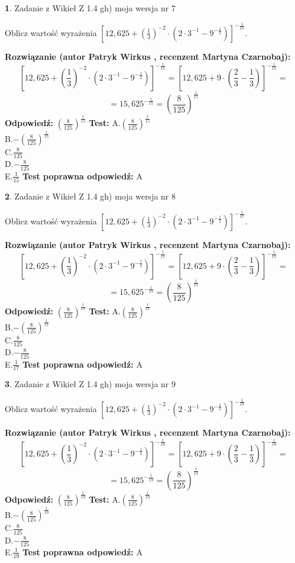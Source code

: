 \documentclass[12pt, a4paper]{article}
\theoremstyle{definition} %
\newtheorem{zad}{}
\newcommand{\zadStart}[1]{\begin{zad}#1\newline}
\newcommand{\zadStop}{\end{zad}}
\newcommand{\rozwStart}[2]{\noindent \textbf{Rozwiązanie (autor #1 , recenzent #2): }\newline}
\newcommand{\rozwStop}{\newline}
\newcommand{\odpStart}{\noindent \textbf{Odpowiedź:}\newline}
\newcommand{\odpStop}{\newline}
\newcommand{\testStart}{\noindent \textbf{Test:}\newline}
\newcommand{\testStop}{\newline}
\newcommand{\kluczStart}{\noindent \textbf{Test poprawna odpowiedź:}\newline}
\newcommand{\kluczStop}{\newline}
\begin{document}
\zadStart{Zadanie z Wikieł Z 1.4 gh) moja wersja nr 7}

Oblicz wartość wyrażenia $[12,625+(\frac{1}{3})^{-2}\cdot(2\cdot 3^{-1} - 9^{-\frac{1}{2}})]^{-\frac{1}{15}}$.
\zadStop
\rozwStart{Patryk Wirkus}{Martyna Czarnobaj}
$$[12,625+(\frac{1}{3})^{-2}\cdot(2\cdot 3^{-1} - 9^{-\frac{1}{2}})]^{-\frac{1}{15}} = [12,625+9\cdot (\frac{2}{3}-\frac{1}{3})]^{-\frac{1}{15}} =$$
$$=15,625^{-\frac{1}{15}} = (\frac{8}{125})^\frac{1}{15}$$
\rozwStop
\odpStart
$(\frac{8}{125})^\frac{1}{15}$
\odpStop
\testStart
A.$(\frac{8}{125})^\frac{1}{15}$\\ B.$-(\frac{8}{125})^\frac{1}{15}$\\ C.$\frac{8}{125}$\\ D.$-\frac{8}{125}$\\ E.$\frac{1}{15}$
\testStop
\kluczStart
A
\kluczStop



\zadStart{Zadanie z Wikieł Z 1.4 gh) moja wersja nr 8}

Oblicz wartość wyrażenia $[12,625+(\frac{1}{3})^{-2}\cdot(2\cdot 3^{-1} - 9^{-\frac{1}{2}})]^{-\frac{1}{17}}$.
\zadStop
\rozwStart{Patryk Wirkus}{Martyna Czarnobaj}
$$[12,625+(\frac{1}{3})^{-2}\cdot(2\cdot 3^{-1} - 9^{-\frac{1}{2}})]^{-\frac{1}{17}} = [12,625+9\cdot (\frac{2}{3}-\frac{1}{3})]^{-\frac{1}{17}} =$$
$$=15,625^{-\frac{1}{17}} = (\frac{8}{125})^\frac{1}{17}$$
\rozwStop
\odpStart
$(\frac{8}{125})^\frac{1}{17}$
\odpStop
\testStart
A.$(\frac{8}{125})^\frac{1}{17}$\\ B.$-(\frac{8}{125})^\frac{1}{17}$\\ C.$\frac{8}{125}$\\ D.$-\frac{8}{125}$\\ E.$\frac{1}{17}$
\testStop
\kluczStart
A
\kluczStop



\zadStart{Zadanie z Wikieł Z 1.4 gh) moja wersja nr 9}

Oblicz wartość wyrażenia $[12,625+(\frac{1}{3})^{-2}\cdot(2\cdot 3^{-1} - 9^{-\frac{1}{2}})]^{-\frac{1}{19}}$.
\zadStop
\rozwStart{Patryk Wirkus}{Martyna Czarnobaj}
$$[12,625+(\frac{1}{3})^{-2}\cdot(2\cdot 3^{-1} - 9^{-\frac{1}{2}})]^{-\frac{1}{19}} = [12,625+9\cdot (\frac{2}{3}-\frac{1}{3})]^{-\frac{1}{19}} =$$
$$=15,625^{-\frac{1}{19}} = (\frac{8}{125})^\frac{1}{19}$$
\rozwStop
\odpStart
$(\frac{8}{125})^\frac{1}{19}$
\odpStop
\testStart
A.$(\frac{8}{125})^\frac{1}{19}$\\ B.$-(\frac{8}{125})^\frac{1}{19}$\\ C.$\frac{8}{125}$\\ D.$-\frac{8}{125}$\\ E.$\frac{1}{19}$
\testStop
\kluczStart
A
\kluczStop
\end{document}

